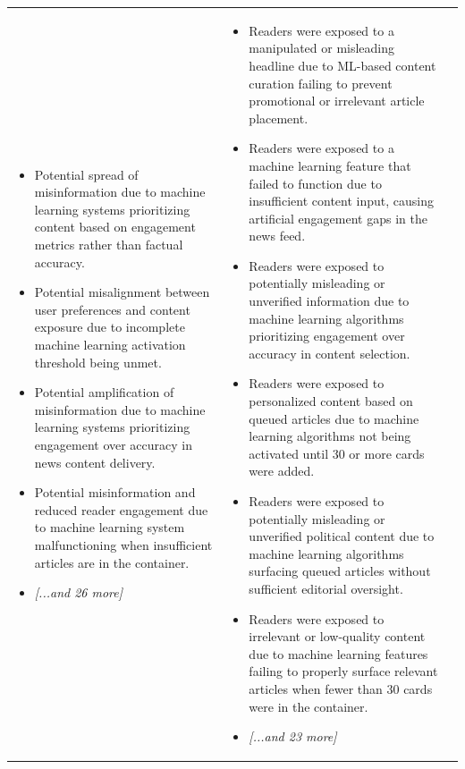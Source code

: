 \begin{longtable}{p{5.2cm}|p{5.2cm}|p{5.2cm}}
\begin{itemize}[leftmargin=*, nosep, before=\vspace{-0.5\baselineskip}, after=\vspace{-0.5\baselineskip}]
\item Potential spread of misinformation due to machine learning systems prioritizing content based on engagement metrics rather than factual accuracy.
\item Potential misalignment between user preferences and content exposure due to incomplete machine learning activation threshold being unmet.
\item Potential amplification of misinformation due to machine learning systems prioritizing engagement over accuracy in news content delivery.
\item Potential misinformation and reduced reader engagement due to machine learning system malfunctioning when insufficient articles are in the container.
\item \textit{[...and 26 more]}
\end{itemize} & \begin{itemize}[leftmargin=*, nosep, before=\vspace{-0.5\baselineskip}, after=\vspace{-0.5\baselineskip}] 
\footnotesize
\item Readers were exposed to a manipulated or misleading headline due to ML-based content curation failing to prevent promotional or irrelevant article placement.
\item Readers were exposed to a machine learning feature that failed to function due to insufficient content input, causing artificial engagement gaps in the news feed.
\item Readers were exposed to potentially misleading or unverified information due to machine learning algorithms prioritizing engagement over accuracy in content selection.
\item Readers were exposed to personalized content based on queued articles due to machine learning algorithms not being activated until 30 or more cards were added.
\item Readers were exposed to potentially misleading or unverified political content due to machine learning algorithms surfacing queued articles without sufficient editorial oversight.
\item Readers were exposed to irrelevant or low-quality content due to machine learning features failing to properly surface relevant articles when fewer than 30 cards were in the container.
\item \textit{[...and 23 more]}
\end{itemize} & \begin{itemize}[leftmargin=*, nosep, before=\vspace{-0.5\baselineskip}, after=\vspace{-0.5\baselineskip}] 

\end{itemize}
\end{longtable}
